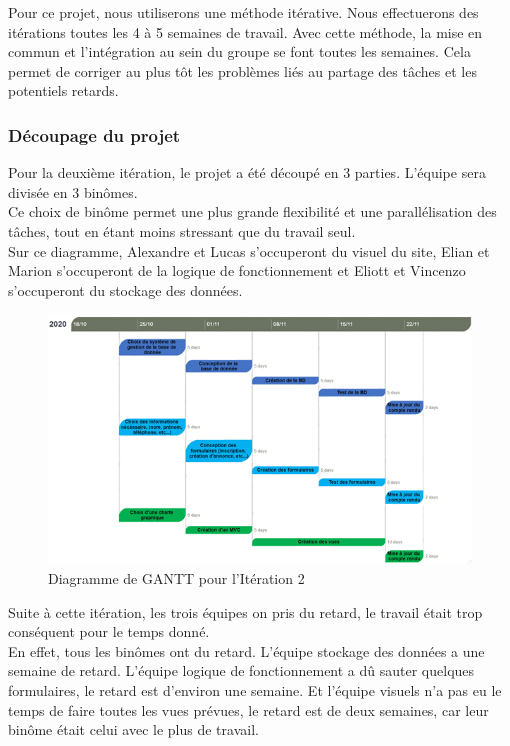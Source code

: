 \documentclass[a4paper,11pt]{article}
\begin{document}
Pour ce projet, nous utiliserons une méthode itérative. Nous effectuerons des itérations toutes les 4
à 5 semaines de travail. Avec cette méthode, la mise en commun et l'intégration au sein du groupe se font toutes les semaines.
Cela permet de corriger au plus tôt les problèmes liés au partage des tâches et les potentiels retards.\\

\subsubsection{Découpage du projet}

Pour la deuxième itération, le projet a été découpé en 3 parties. L’équipe sera divisée en 3 binômes.\\

Ce choix de binôme permet une plus grande flexibilité et une parallélisation des tâches, tout en étant
moins stressant que du travail seul.\\

Sur ce diagramme, Alexandre et Lucas s'occuperont du visuel du site,
Elian et Marion s'occuperont de la logique de fonctionnement et
Eliott et Vincenzo s'occuperont du stockage des données.\\

\begin{figure}[H]
  \includegraphics[width=\linewidth]{images/gantt-iteration2.png}
  \caption{Diagramme de GANTT pour l'Itération 2}
  \label{fig:gantt-iteration2}
\end{figure}

Suite à cette itération, les trois équipes on pris du retard, le travail était trop conséquent pour le temps donné.\\
En effet, tous les binômes ont du retard. L'équipe stockage des données a une semaine de retard.
L'équipe logique de fonctionnement a dû sauter quelques formulaires, le retard est d'environ une semaine.
Et l'équipe visuels n'a pas eu le temps de faire toutes les vues prévues, le retard est de deux semaines, car leur binôme était celui avec le plus de travail.
\end{document}
